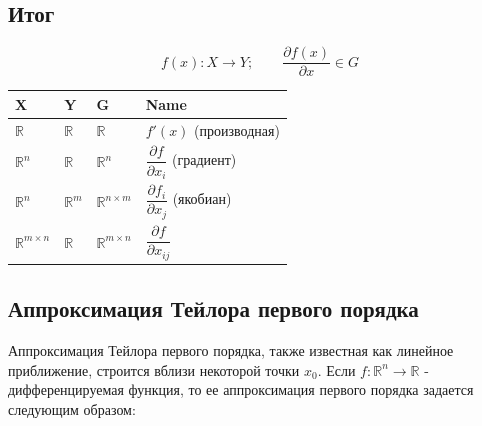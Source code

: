 \documentclass[
  russian,
  letterpaper,
  DIV=11,
  numbers=noendperiod]{scrartcl}
\begin{document}
\subsection{Итог}\label{ux438ux442ux43eux433}

\[
f(x) : X \to Y; \qquad \frac{\partial f(x)}{\partial x} \in G
\]

\begin{longtable}[]{@{}
  >{\centering\arraybackslash}p{}
  >{\centering\arraybackslash}p{}
  >{\centering\arraybackslash}p{}
  >{\centering\arraybackslash}p{}@{}}
\toprule\noalign{}
\begin{minipage}[b]{\linewidth}\centering
X
\end{minipage} & \begin{minipage}[b]{\linewidth}\centering
Y
\end{minipage} & \begin{minipage}[b]{\linewidth}\centering
G
\end{minipage} & \begin{minipage}[b]{\linewidth}\centering
Name
\end{minipage} \\
\midrule\noalign{}
\endhead
\bottomrule\noalign{}
\endlastfoot
\(\mathbb{R}\) & \(\mathbb{R}\) & \(\mathbb{R}\) & \(f'(x)\)
(производная) \\
\(\mathbb{R}^n\) & \(\mathbb{R}\) & \(\mathbb{R}^n\) &
\(\dfrac{\partial f}{\partial x_i}\) (градиент) \\
\(\mathbb{R}^n\) & \(\mathbb{R}^m\) & \(\mathbb{R}^{n \times m}\) &
\(\dfrac{\partial f_i}{\partial x_j}\) (якобиан) \\
\(\mathbb{R}^{m \times n}\) & \(\mathbb{R}\) &
\(\mathbb{R}^{m \times n}\) & \(\dfrac{\partial f}{\partial x_{ij}}\) \\
\end{longtable}

\subsection{Аппроксимация Тейлора первого
порядка}\label{ux430ux43fux43fux440ux43eux43aux441ux438ux43cux430ux446ux438ux44f-ux442ux435ux439ux43bux43eux440ux430-ux43fux435ux440ux432ux43eux433ux43e-ux43fux43eux440ux44fux434ux43aux430}

Аппроксимация Тейлора первого порядка, также известная как линейное
приближение, строится вблизи некоторой точки \(x_0\). Если
\(f: \mathbb{R}^n \rightarrow \mathbb{R}\) - дифференцируемая функция,
то ее аппроксимация первого порядка задается следующим образом:
\end{document}
